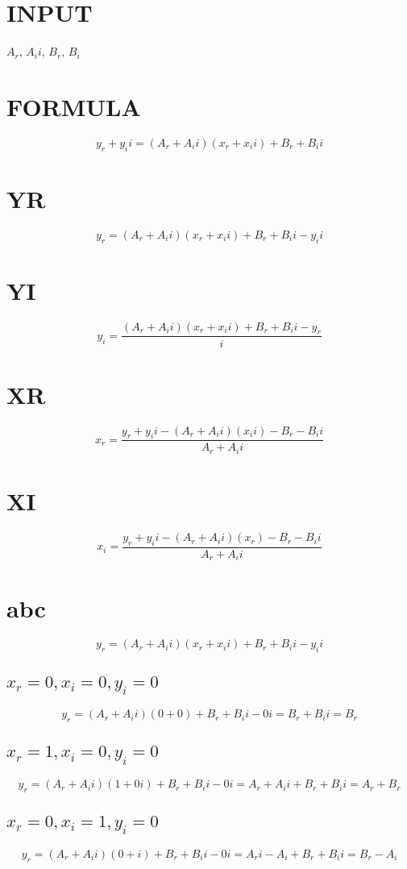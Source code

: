 \documentclass[a4paper]{article}
\begin{document}
\section{INPUT}
$A_r$, $A_ii$, $B_r$, $B_i$

\section{FORMULA}
$$ y_r + y_ii = (A_r + A_ii)(x_r + x_ii) + B_r + B_ii $$

\section{YR}
$$ y_r = (A_r + A_ii)(x_r + x_ii) + B_r + B_ii - y_ii$$

\section{YI}
$$ y_i = \frac{(A_r + A_ii)(x_r + x_ii) + B_r + B_ii - y_r}{i} $$

\section{XR}
$$ x_r = \frac{y_r + y_ii - (A_r + A_ii)(x_ii) - B_r - B_ii}{A_r + A_ii} $$

\section{XI}
$$ x_i = \frac{y_r + y_ii - (A_r + A_ii)(x_r) - B_r - B_ii}{A_r + A_ii} $$

\section{abc}
$$ y_r = (A_r + A_ii)(x_r + x_ii) + B_r + B_ii - y_ii $$

\subsection{$x_r = 0, x_i = 0, y_i = 0$}
$$ y_r = (A_r + A_ii)(0 + 0) + B_r + B_ii - 0i = B_r + B_ii = B_r $$

\subsection{$x_r = 1, x_i = 0, y_i = 0$}
$$ y_r = (A_r + A_ii)(1 + 0i) + B_r + B_ii - 0i = A_r + A_ii + B_r + B_ii = A_r + B_r $$

\subsection{$x_r = 0, x_i = 1, y_i = 0$}
$$ y_r = (A_r + A_ii)(0 + i) + B_r + B_ii - 0i = A_ri - A_i + B_r + B_ii = B_r - A_i $$
\end{document}
